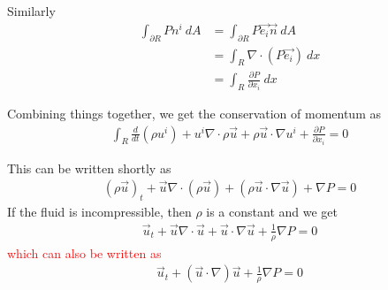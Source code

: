 Similarly
\begin{align*}
  \int_{\partial R}  P n^i \ d A &= \int_{\partial R}  P \vec{e_i}
  \vec{n} \ d  A \\
  &= \int_R \nabla \cdot(P \vec{e_i}) \ d x \\
  &= \int_R \frac{\partial P}{\partial x_i} \ d x
\end{align*}

Combining things together, we get the conservation of momentum as
\begin{align*}
  \int_R  \frac{d}{d t}(\rho u^i) + u^i \nabla \cdot\rho \vec{u} +
  \rho \vec{u}\cdot \nabla u^i +  \frac{\partial P}{\partial x_i} = 0
\end{align*}

This can be written shortly as
\begin{align*}
  (\rho \vec{u})_t + \vec{u} \nabla \cdot(\rho \vec{u}) + (\rho
  \vec{u} \cdot \nabla \vec{u}) + \nabla P = 0
\end{align*}
If the fluid is incompressible, then $\rho$ is a constant and we get
\begin{align*}
  \vec{u}_t + \vec{u} \nabla \cdot \vec{u} + \vec{u} \cdot \nabla
  \vec{u} + \frac{1}{\rho} \nabla P = 0
\end{align*} \textcolor{red}{which can also be written as}
\begin{align*}
  \vec{u}_t + (\vec{u} \cdot \nabla) \vec{u} + \frac{1}{\rho} \nabla P = 0
\end{align*}
